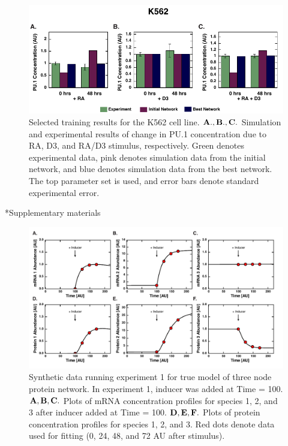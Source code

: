 \documentclass[12pt]{article}
\makeatletter
\renewcommand\section{\@startsection
	{subsection}{2}{0mm}
	{-0.2in}
	{0.05\baselineskip}
	{\normalfont\large\bfseries}}
\makeatother
\begin{document}
\begin{figure}\centering
\includegraphics[width=1.0\textwidth]{./figs_chp3/Cell_Line_New/K562_Experiment_2.pdf}
\caption{Selected training results for the K562 cell line. $\bf{A., B., C.}$ Simulation and experimental results of change in PU.1 concentration due to RA, D3, and RA/D3 stimulus, respectively. Green denotes experimental data, pink denotes simulation data from the initial network, and blue denotes simulation data from the best network. The top parameter set is used, and error bars denote standard experimental error.}
\label{fg:K562_Experiment}
\end{figure}
\clearpage

\renewcommand\thefigure{S\arabic{figure}}
\renewcommand\thetable{T\arabic{table}}
\renewcommand\thepage{S-\arabic{page}}
\renewcommand\theequation{S\arabic{equation}}

\setcounter{equation}{0}
\setcounter{table}{0}
\setcounter{figure}{0}
\setcounter{page}{1}

\section*{Supplementary materials}

\clearpage

\begin{figure}\centering
\includegraphics[width=1.0\textwidth]{./figs_chp3/True_Model_Simulation_9677.pdf}
\caption{Synthetic data running experiment 1 for true model of three node protein network. In experiment 1, inducer was added at Time = 100. $\bf{A, B, C.}$ Plots of mRNA concentration profiles for species 1, 2, and 3 after inducer added at Time = 100. $\bf{D, E, F.}$ Plots of protein concentration profiles for species 1, 2, and 3. Red dots denote data used for fitting (0, 24, 48, and 72 AU after stimulus).}
\label{fg:TrueModelData}
\end{figure}
\end{document}
